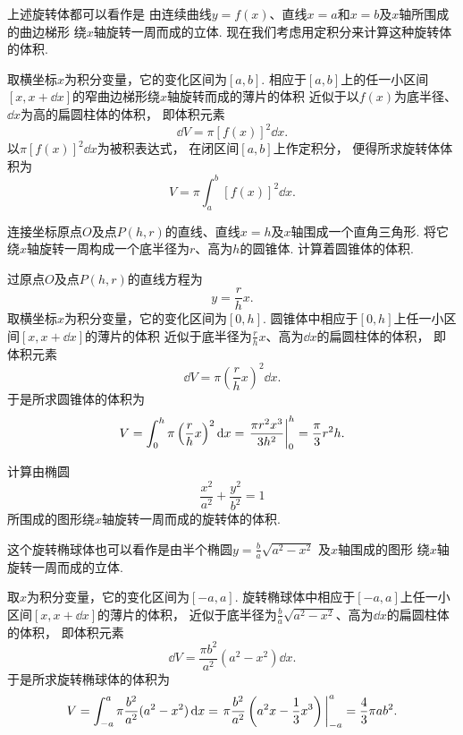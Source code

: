 上述旋转体都可以看作是
由连续曲线\(y=f(x)\)、直线\(x=a\)和\(x=b\)及\(x\)轴所围成的曲边梯形
绕\(x\)轴旋转一周而成的立体.
现在我们考虑用定积分来计算这种旋转体的体积.

取横坐标\(x\)为积分变量，它的变化区间为\([a,b]\).
相应于\([a,b]\)上的任一小区间\([x,x+\dd{x}]\)的窄曲边梯形绕\(x\)轴旋转而成的薄片的体积
近似于以\(f(x)\)为底半径、\(\dd{x}\)为高的扁圆柱体的体积，
即体积元素\[
	\dd{V} = \pi [f(x)]^2 \dd{x}.
\]
以\(\pi [f(x)]^2 \dd{x}\)为被积表达式，
在闭区间\([a,b]\)上作定积分，
便得所求旋转体体积为\begin{equation}\label{equation:定积分.曲边梯形绕x轴旋转体的体积}
	V = \pi \int_a^b [f(x)]^2 \dd{x}.
\end{equation}

\begin{example}
连接坐标原点\(O\)及点\(P(h,r)\)的直线、直线\(x=h\)及\(x\)轴围成一个直角三角形.
将它绕\(x\)轴旋转一周构成一个底半径为\(r\)、高为\(h\)的圆锥体.
计算着圆锥体的体积.
\begin{solution}
过原点\(O\)及点\(P(h,r)\)的直线方程为\[
	y = \frac{r}{h} x.
\]
取横坐标\(x\)为积分变量，它的变化区间为\([0,h]\).
圆锥体中相应于\([0,h]\)上任一小区间\([x,x+\dd{x}]\)的薄片的体积
近似于底半径为\(\frac{r}{h} x\)、高为\(\dd{x}\)的扁圆柱体的体积，
即体积元素\[
	\dd{V} = \pi \left(\frac{r}{h} x\right)^2 \dd{x}.
\]
于是所求圆锥体的体积为\[
	V = \int_0^h \pi \left(\frac{r}{h} x\right)^2 \dd{x}
	= \eval{\frac{\pi r^2 x^3}{3 h^2}}_0^h
	= \frac\pi3 r^2 h.
\]
\end{solution}
\end{example}

\begin{example}
计算由椭圆\[
	\frac{x^2}{a^2}+\frac{y^2}{b^2}=1
\]所围成的图形绕\(x\)轴旋转一周而成的旋转体的体积.
\begin{solution}
这个旋转椭球体也可以看作是由半个椭圆\(y = \frac{b}{a} \sqrt{a^2-x^2}\)
及\(x\)轴围成的图形
绕\(x\)轴旋转一周而成的立体.

取\(x\)为积分变量，它的变化区间为\([-a,a]\).
旋转椭球体中相应于\([-a,a]\)上任一小区间\([x,x+\dd{x}]\)的薄片的体积，
近似于底半径为\(\frac{b}{a} \sqrt{a^2-x^2}\)、高为\(\dd{x}\)的扁圆柱体的体积，
即体积元素\[
	\dd{V} = \frac{\pi b^2}{a^2} (a^2-x^2) \dd{x}.
\]
于是所求旋转椭球体的体积为\[
	V = \int_{-a}^a \pi \frac{b^2}{a^2} (a^2-x^2) \dd{x}
	= \eval{\pi \frac{b^2}{a^2} \left(a^2x-\frac13x^3\right)}_{-a}^a
	= \frac43 \pi a b^2.
\]
\end{solution}
\end{example}

